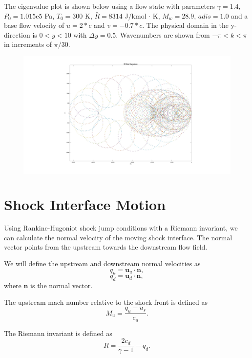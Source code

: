 \documentclass[10pt]{article}
\begin{document}
	The eigenvalue plot is shown below using a flow state with parameters $\gamma = 1.4$, $P_0 = 1.015\mathrm{e}5$ Pa, $T_0 = 300$ K, $\bar{R} = 8314$ J/kmol $\cdot$ K, $M_w = 28.9$, $adis = 1.0$ and a base flow velocity of $u=2*c$ and $v=-0.7*c$. The physical domain in the y-direction is $0<y<10$ with $\Delta y = 0.5$. Wavenumbers are shown from $-\pi<k<\pi$ in increments of $\pi/30$.
	
	\begin{figure}[h]
		\includegraphics[width=16cm]{2D_euler_eig}
		\centering
	\end{figure}
	
	\section{Shock Interface Motion}
	
	Using Rankine-Hugoniot shock jump conditions with a Riemann invariant, we can calculate the normal velocity of the moving shock interface. The normal vector points from the upstream towards the downstream flow field. 
	
	We will define the upstream and downstream normal velocities as
	\begin{equation}
		q_u = \mathbf{u}_u \cdot \mathbf{n},
	\end{equation}
	\begin{equation}
		q_d = \mathbf{u}_d \cdot \mathbf{n},
	\end{equation}
	where $\mathbf{n}$ is the normal vector.
	
	The upstream mach number relative to the shock front is defined as
	\begin{equation} \label{Mach_upstream}
		M_u = \frac{q_u - u_s}{c_u}.
	\end{equation}
	
	The Riemann invariant is defined as
	\begin{equation} \label{RiemannInvariant}
		R = \frac{2c_d}{\gamma - 1} - q_d.
	\end{equation}
\end{document}
